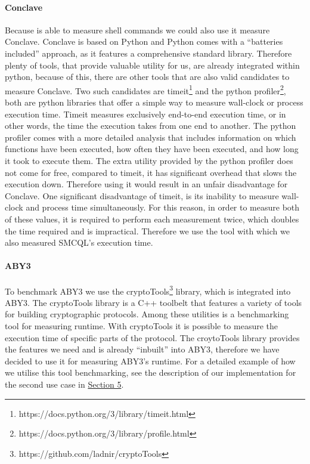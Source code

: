 \paragraph{Conclave}
Because  is able to measure shell commands we could also use it measure Conclave. Conclave is based on Python and Python comes with a ``batteries included'' approach, as it features a comprehensive standard library. Therefore plenty of tools, that provide valuable utility for us, are already integrated within python, because of this, there are other tools that are also valid candidates to measure Conclave. Two such candidates are timeit\footnote{https://docs.python.org/3/library/timeit.html} and the python profiler\footnote{https://docs.python.org/3/library/profile.html}, both are python libraries that offer a simple way to measure wall-clock or process execution time. Timeit measures exclusively end-to-end execution time, or in other words, the time the execution takes from one end to another. The python profiler comes with a more detailed analysis that includes information on which functions have been executed, how often they have been executed, and how long it took to execute them. The extra utility provided by the python profiler does not come for free, compared to timeit, it has significant overhead that slows the execution down. Therefore using it would result in an unfair disadvantage for Conclave. One significant disadvantage of timeit, is its inability to measure wall-clock and process time simultaneously. For this reason, in order to measure both of these values, it is required to perform each measurement twice, which doubles the time required and is impractical. Therefore we use the  tool with which we also measured SMCQL's execution time.  



\paragraph{ABY3}
 To benchmark ABY3 we use the cryptoTools\footnote{https://github.com/ladnir/cryptoTools} library, which is integrated into ABY3. The cryptoTools library is a C++ toolbelt that features a variety of tools for building cryptographic protocols. Among these utilities is a benchmarking tool for measuring runtime. With cryptoTools it is possible to measure the execution time of specific parts of the protocol. The croytoTools library provides the features we need and is already ``inbuilt'' into ABY3, therefore we have decided to use it for measuring ABY3's runtime. For a detailed example of how we utilise this tool benchmarking, see the description of our implementation for the second use case in \hyperref[Implementation]{Section 5}.




